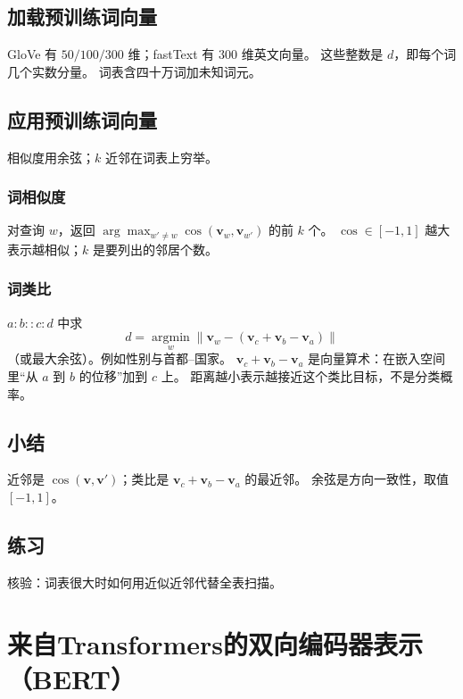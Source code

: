 \subsection{加载预训练词向量}

GloVe 有 $50/100/300$ 维；fastText 有 $300$ 维英文向量。
这些整数是 $d$，即每个词几个实数分量。
词表含四十万词加未知词元。

\subsection{应用预训练词向量}

相似度用余弦；$k$ 近邻在词表上穷举。

\subsubsection{词相似度}

对查询 $w$，返回 $\arg\max_{w'\neq w}\cos(\bm{v}_w,\bm{v}_{w'})$ 的前 $k$ 个。
$\cos\in[-1,1]$ 越大表示越相似；$k$ 是要列出的邻居个数。

\subsubsection{词类比}

$a:b::c:d$ 中求
\[
d=\operatorname*{argmin}_{w}\bigl\|\bm{v}_w-(\bm{v}_c+\bm{v}_b-\bm{v}_a)\bigr\|
\]
（或最大余弦）。例如性别与首都–国家。
$\bm{v}_c+\bm{v}_b-\bm{v}_a$ 是向量算术：在嵌入空间里“从 $a$ 到 $b$ 的位移”加到 $c$ 上。
距离越小表示越接近这个类比目标，不是分类概率。

\subsection{小结}

近邻是 $\cos(\bm{v},\bm{v}')$；类比是 $\bm{v}_c+\bm{v}_b-\bm{v}_a$ 的最近邻。
余弦是方向一致性，取值 $[-1,1]$。

\subsection{练习}

核验：词表很大时如何用近似近邻代替全表扫描。

\section{来自Transformers的双向编码器表示（BERT）}


